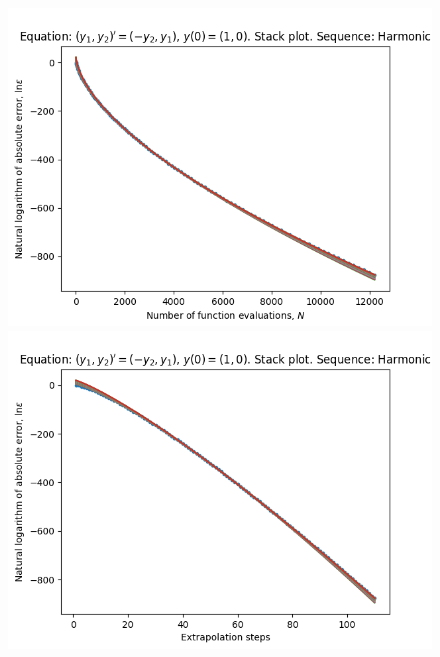 \begin{figure}[H]
\centering
\begin{minipage}{0.45\textwidth}
\centering
\includegraphics[scale=0.45]{../results/emr_plots/rotation_hp_harmonic_stack.png}
\end{minipage}
\begin{minipage}{0.45\textwidth}
\centering
\includegraphics[scale=0.45]{../results/emr_plots/rotation_hp_harmonic_steps_stack.png}
\end{minipage}
\end{figure}

